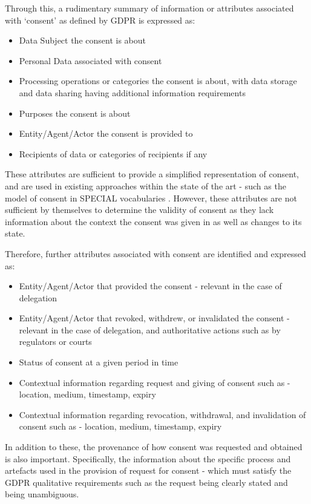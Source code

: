 Through this, a rudimentary summary of information or attributes associated with `consent' as defined by GDPR is expressed as:
\begin{itemize}
    \item Data Subject the consent is about
    \item Personal Data associated with consent
    \item Processing operations or categories the consent is about, with data storage and data sharing having additional information requirements
    \item Purposes the consent is about
    \item Entity/Agent/Actor the consent is provided to
    \item Recipients of data or categories of recipients if any
\end{itemize}
These attributes are sufficient to provide a simplified representation of consent, and are used in existing approaches within the state of the art - such as the model of consent in SPECIAL vocabularies \cite{bonatti_special_2018}. However, these attributes are not sufficient by themselves to determine the validity of consent as they lack information about the context the consent was given in as well as changes to its state.

Therefore, further attributes associated with consent are identified and expressed as:
\begin{itemize}
    \item Entity/Agent/Actor that provided the consent - relevant in the case of delegation
    \item Entity/Agent/Actor that revoked, withdrew, or invalidated the consent - relevant in the case of delegation, and authoritative actions such as by regulators or courts
    \item Status of consent at a given period in time
    \item Contextual information regarding request and giving of consent such as - location, medium, timestamp, expiry
    \item Contextual information regarding revocation, withdrawal, and invalidation of consent such as - location, medium, timestamp, expiry
\end{itemize}
In addition to these, the provenance of how consent was requested and obtained is also important.
Specifically, the information about the specific process and artefacts used in the provision of request for consent - which must satisfy the GDPR qualitative requirements such as the request being clearly stated and being unambiguous.

